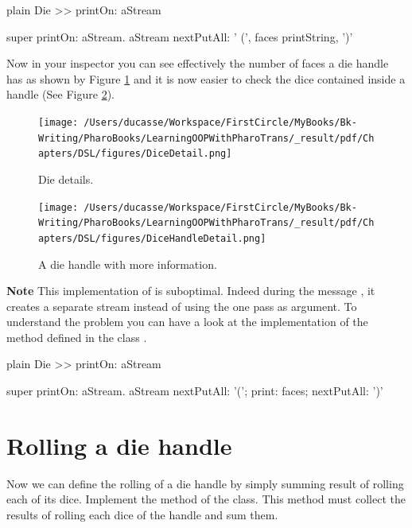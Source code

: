 \documentclass[10pt,twoside,english]{_support/latex/sbabook/sbabook}
\begin{document}
\begin{displaycode}{plain}
Die >> printOn: aStream

	super printOn: aStream.
	aStream nextPutAll: ' (', faces printString, ')'
\end{displaycode}

Now in your inspector you can see effectively the number of faces a die handle has as shown by Figure \ref{diceDetail} and it is now easier to check the dice contained inside a handle (See Figure \ref{DieHandleDetail}).


\begin{figure}

\begin{center}
\texttt{[image: /Users/ducasse/Workspace/FirstCircle/MyBooks/Bk-Writing/PharoBooks/LearningOOPWithPharoTrans/\_result/pdf/Chapters/DSL/figures/DiceDetail.png]}\caption{Die details.\label{diceDetail}}\end{center}
\end{figure}
 


\begin{figure}

\begin{center}
\texttt{[image: /Users/ducasse/Workspace/FirstCircle/MyBooks/Bk-Writing/PharoBooks/LearningOOPWithPharoTrans/\_result/pdf/Chapters/DSL/figures/DiceHandleDetail.png]}\caption{A die handle with more information.\label{DieHandleDetail}}\end{center}
\end{figure}
 

\textbf{Note} This implementation of  is suboptimal. Indeed during the message , it creates a separate stream instead of using the one pass as argument.
To understand the problem you can have a look at the implementation of the method  defined in the class . 

\begin{displaycode}{plain}
Die >> printOn: aStream
	
	super printOn: aStream.
	aStream 
		nextPutAll: '(';
		print: faces; 
		nextPutAll: ')'
\end{displaycode}
\section{Rolling a die handle}
Now we can define the rolling of a die handle by simply summing result of rolling each of its dice. 
Implement the  method of the  class. This method must collect the results of rolling each dice of the handle and sum them.
\end{document}
